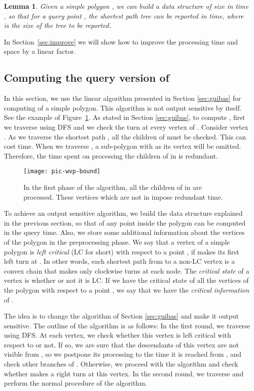 \documentclass[5p]{elsarticle}
\newtheorem{lemma}[theorem]{Lemma}
\begin{document}
\begin{lemma}
Given a simple polygon , we can build a data structure of size  
in time , so that for a query point , the 
shortest path tree  can be reported in  time, where  is 
the size of the tree to be reported.
\end{lemma}

In Section~\ref{sec:improve} we will show how to improve
the processing time and space by a linear factor.


\subsection{Computing the query version of } \label{sec:wvp}
In this section, we use the linear algorithm presented in Section \ref{sec:guibas} for 
computing  of a simple polygon. This algorithm is not output sensitive by itself.
See the example of Figure~\ref{g1}. As stated in Section \ref{sec:guibas}, to compute ,
first we traverse  using DFS and we check the turn at every vertex of .
Consider vertex . As we traverse the shortest path , 
all the children of  must be checked. This can cost  time.
When we traverse , a sub-polygon with  as its vertex will be omitted. 
Therefore, the time spent on processing the children of  in  is redundant.


\begin{figure}[h]
  \centering
  \texttt{[image: pic-wvp-bound]} 
  \caption{In the first phase of the algorithm, all the
  children of  in  are processed. These vertices which are not 
  in  impose redundant  time.} 
  \label{g1}
\end{figure}




To achieve an output sensitive algorithm, 
we build the data structure explained in the previous 
section, so that  of any point inside the polygon can be computed in the query time.
Also, we store some additional information about the
vertices of the polygon in the preprocessing phase.
We say that a vertex  of a simple polygon is {\em left critical} (LC for short) with respect to
a point , if  makes its first left turn at . In other words, 
each shortest path from  to a non-LC vertex is a convex chain that 
makes only clockwise turns at each node. 
The {\em critical state} of a vertex is whether or not it is LC. 
If we have the critical state of all the vertices of the polygon with respect to a 
point , we say that we have the {\em critical information} of .

The idea is to change the algorithm of Section \ref{sec:guibas} and
make it output sensitive. The outline of the algorithm is
as follows: In the first round, we traverse  using
DFS. At each vertex, we check whether this vertex is left
critical with respect to  or not. If so, we are sure that the
descendants of this vertex are not visible from , so we
postpone its processing to the time it is reached from ,
and check other branches of . Otherwise, we proceed
with the algorithm and check whether  makes a
right turn at this vertex. In the second round,  we traverse  and 
perform the normal procedure of the algorithm.
\end{document}
